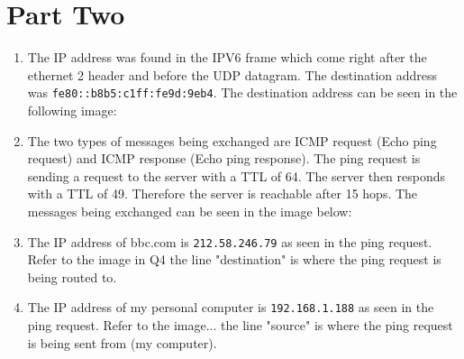 \documentclass[fleqn, 12pt]{article}
\newcommand{\code}[1]{\colorbox{codegray}{\texttt{#1}}}
\begin{document}
\newpage

\section*{Part Two}

\begin{enumerate}[1)]
    \item
        The IP address was found in the IPV6 frame which come right after the ethernet 2 header and before the UDP datagram. The destination address was \code{fe80::b8b5:c1ff:fe9d:9eb4}. The destination address can be seen in the following image:\\
        
        
    \item
        The two types of messages being exchanged are ICMP request (Echo ping request) and ICMP response (Echo ping response). The ping request is sending a request to the server with a TTL of 64. The server then responds with a TTL of 49. Therefore the server is reachable after 15 hops. The messages being exchanged can be seen in the image below:\\
        
        
    \newpage
    \item
        The IP address of bbc.com is \code{212.58.246.79} as seen in the ping request. Refer to the image in Q4 the line "destination" is where the ping request is being routed to.
        
    \item
        The IP address of my personal computer is \code{192.168.1.188} as seen in the ping request. Refer to the image... the line "source" is where the ping request is being sent from (my computer).\\
        
\end{enumerate}
\end{document}
